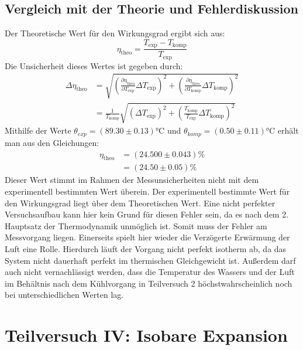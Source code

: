 \documentclass{report}
\begin{document}
\subsection{Vergleich mit der Theorie und Fehlerdiskussion}
Der Theoretische Wert für den Wirkungsgrad ergibt sich aus:
\begin{equation}
    \eta_{\mathrm{theo}} = \frac{T_{\mathrm{exp}} - T_{\mathrm{komp}}}{T_{\mathrm{exp}}}
\end{equation}
Die Unsicherheit dieses Wertes ist gegeben durch:
\begin{equation}
    \begin{split}
        \Delta \eta_{\mathrm{theo}} &= \sqrt{\left(\frac{\partial \eta_{\mathrm{theo}}}{\partial T_{\mathrm{exp}}} \Delta T_{\mathrm{exp}}\right)^2 + \left(\frac{\partial \eta_{\mathrm{theo}}}{\partial T_{\mathrm{komp}}} \Delta T_{\mathrm{komp}}\right)^2}\\
                                    &= \frac{1}{T_{\mathrm{komp}}} \sqrt{\left(\Delta T_\mathrm{exp}\right)^2 + \left(\frac{T_{\mathrm{komp}}}{T_{\mathrm{exp}}}\Delta T_{\mathrm{komp}}\right)^2}
    \end{split}
\end{equation}
Mithilfe der Werte $\theta_{exp} = (89.30 \pm 0.13) \si{\degreeCelsius}$ und $\theta_{komp} = (0.50 \pm 0.11) \si{\degreeCelsius}$ erhält man aus den Gleichungen:
\begin{equation}
    \begin{split}
        \eta_{\mathrm{theo}}    &= (24.500 \pm 0.043) \% \\
                                &= (24.50 \pm 0.05) \%
    \end{split}
\end{equation}
Dieser Wert stimmt im Rahmen der Messunsicherheiten nicht mit dem experimentell bestimmten Wert überein. Der experimentell bestimmte Wert für den Wirkungsgrad liegt über 
dem Theoretischen Wert. Eine nicht perfekter Versuchsaufbau kann hier kein Grund für diesen Fehler sein, da es nach dem 2. Hauptsatz der Thermodynamik unmöglich ist. 
Somit muss der Fehler am Messvorgang liegen. Einerseits spielt hier wieder die Verzögerte Erwärmung der Luft eine Rolle. Hierdurch läuft der Vorgang nicht perfekt 
isotherm ab, da das System nicht dauerhaft perfekt im thermischen Gleichgewicht ist. Außerdem darf auch nicht vernachlässigt werden, dass die Temperatur des Wassers 
und der Luft im Behältnis nach dem Kühlvorgang in Teilversuch 2 höchstwahrscheinlich noch bei unterschiedlichen Werten lag.
\newpage
\section{Teilversuch IV: Isobare Expansion}
\end{document}
